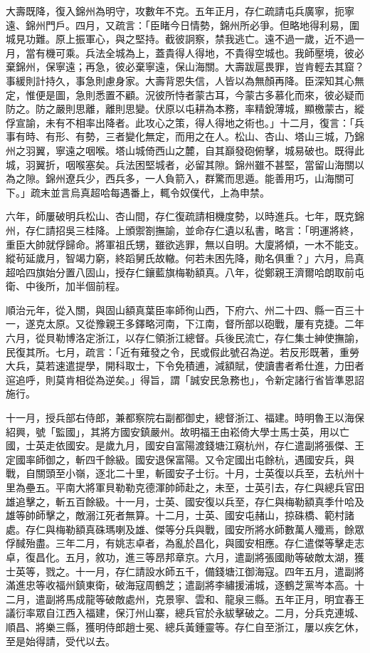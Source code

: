 \begin{pinyinscope}
大壽既降，復入錦州為明守，攻數年不克。五年正月，存仁疏請屯兵廣寧，扼寧遠、錦州門戶。四月，又疏言：「臣睹今日情勢，錦州所必爭。但略地得利易，圍城見功難。原上振軍心，與之堅持。截彼詗察，禁我逃亡。遠不過一歲，近不過一月，當有機可乘。兵法全城為上，蓋貴得人得地，不貴得空城也。我師壓境，彼必棄錦州，保寧遠；再急，彼必棄寧遠，保山海關。大壽跋扈畏罪，豈肯輕去其窟？事緩則計持久，事急則慮身家。大壽背恩失信，人皆以為無顏再降。臣深知其心無定，惟便是圖，急則悉置不顧。況彼所恃者蒙古耳，今蒙古多慕化而來，彼必疑而防之。防之嚴則思離，離則思變。伏原以屯耕為本務，率精銳薄城，顯檄蒙古，縱俘宣諭，未有不相率出降者。此攻心之策，得人得地之術也。」十二月，復言：「兵事有時、有形、有勢，三者變化無定，而用之在人。松山、杏山、塔山三城，乃錦州之羽翼，寧遠之咽喉。塔山城倚西山之麓，自其巔發砲俯擊，城易破也。既得此城，羽翼折，咽喉塞矣。兵法困堅城者，必留其隙。錦州雖不甚堅，當留山海關以為之隙。錦州遼兵少，西兵多，一人負箭入，群驚而思遁。能善用巧，山海關可下。」疏末並言烏真超哈每遇番上，輒令奴僕代，上為申禁。

六年，師屢破明兵松山、杏山間，存仁復疏請相機度勢，以時進兵。七年，既克錦州，存仁請招吳三桂降。上頒禦劄撫諭，並命存仁遺以私書，略言：「明運將終，重臣大帥就俘歸命。將軍祖氏甥，雖欲逃罪，無以自明。大廈將傾，一木不能支。縱茍延歲月，智竭力窮，終蹈舅氏故轍。何若未困先降，勛名俱重？」六月，烏真超哈四旗始分置八固山，授存仁鑲藍旗梅勒額真。八年，從鄭親王濟爾哈朗取前屯衛、中後所，加半個前程。

順治元年，從入關，與固山額真葉臣率師徇山西，下府六、州二十四、縣一百三十一，遂克太原。又從豫親王多鐸略河南，下江南，督所部以砲戰，屢有克捷。二年六月，從貝勒博洛定浙江，以存仁領浙江總督。兵後民流亡，存仁集士紳使撫諭，民復其所。七月，疏言：「近有薙發之令，民或假此號召為逆。若反形既著，重勞大兵，莫若速遣提學，開科取士，下令免積逋，減額賦，使讀書者希仕進，力田者逭追呼，則莫肯相從為逆矣。」得旨，謂「誠安民急務也」，令新定諸行省皆準恩詔施行。

十一月，授兵部右侍郎，兼都察院右副都御史，總督浙江、福建。時明魯王以海保紹興，號「監國」，其將方國安鎮嚴州。故明福王由崧倚大學士馬士英，用以亡國，士英走依國安。是歲九月，國安自富陽渡錢塘江窺杭州，存仁遣副將張傑、王定國率師御之，斬四千餘級。國安退保富陽。又令定國出屯餘杭，遇國安兵，與戰，自關頭至小嶺，逐北二十里，斬國安子士衍。十月，士英復以兵至，去杭州十里為壘五。平南大將軍貝勒勒克德渾帥師赴之，未至，士英引去，存仁與總兵官田雄追擊之，斬五百餘級。十一月，士英、國安復以兵至，存仁與梅勒額真季什哈及雄等帥師擊之，敵溺江死者無算。十二月，士英、國安屯赭山，掠硃橋、範村諸處。存仁與梅勒額真硃瑪喇及雄、傑等分兵與戰，國安所將水師數萬人殲焉，餘眾俘馘殆盡。三年二月，有姚志卓者，為亂於昌化，與國安相應。存仁遣傑等擊走志卓，復昌化。五月，敘功，進三等昂邦章京。六月，遣副將張國勛等破敵太湖，獲士英等，戮之。十一月，存仁請設水師五千，備錢塘江御海寇。四年五月，遣副將滿進忠等收福州鎮東衛，破海寇周鶴芝；遣副將李繡援浦城，逐鶴芝黨岑本高。十二月，遣副將馬成龍等破敵處州，克景寧、雲和、龍泉三縣。五年正月，明宜春王議衍率眾自江西入福建，保汀州山寨，總兵官於永紱擊破之。二月，分兵克連城、順昌、將樂三縣，獲明侍郎趙士冕、總兵黃鍾靈等。存仁自至浙江，屢以疾乞休，至是始得請，受代以去。


\end{pinyinscope}
